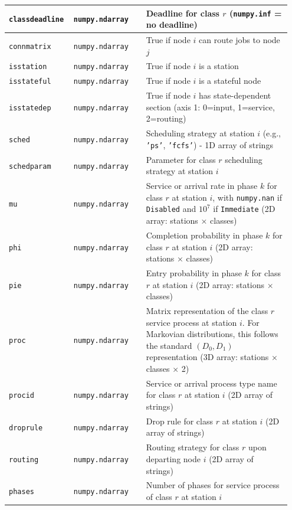 \begin{PYTHON}
{\begin{longtable}{|p{0.20\linewidth}|p{0.25\linewidth}|p{0.50\linewidth}|}
\texttt{classdeadline} & \texttt{numpy.ndarray} & Deadline for class $r$ (\texttt{numpy.inf} = no deadline)\\\hline
\texttt{connmatrix} & \texttt{numpy.ndarray} & True if node $i$ can route jobs to node $j$\\\hline
\texttt{isstation} & \texttt{numpy.ndarray} & True if node $i$ is a station\\\hline
\texttt{isstateful} & \texttt{numpy.ndarray} & True if node $i$ is a stateful node\\\hline
\texttt{isstatedep} & \texttt{numpy.ndarray} & True if node $i$ has state-dependent section (axis 1: 0=input, 1=service, 2=routing)\\\hline
\texttt{sched} & \texttt{numpy.ndarray} & Scheduling strategy at station $i$ (e.g., \texttt{'ps'}, \texttt{'fcfs'}) - 1D array of strings\\\hline
\texttt{schedparam} & \texttt{numpy.ndarray} & Parameter for class $r$ scheduling strategy at station $i$\\\hline
\texttt{mu} & \texttt{numpy.ndarray} & Service or arrival rate in phase $k$ for class $r$ at station $i$, with \texttt{numpy.nan} if \texttt{Disabled} and $10^7$ if \texttt{Immediate} (2D array: stations × classes)\\\hline
\texttt{phi} & \texttt{numpy.ndarray} & Completion probability in phase $k$ for class $r$ at station $i$ (2D array: stations × classes)\\\hline
\texttt{pie} & \texttt{numpy.ndarray} & Entry probability in phase $k$ for class $r$ at station $i$ (2D array: stations × classes)\\\hline
\texttt{proc} & \texttt{numpy.ndarray} & Matrix representation of the class $r$ service process at station $i$. For Markovian distributions, this follows the standard $(D_0,D_1)$ representation (3D array: stations × classes × 2)\\\hline
\texttt{procid} & \texttt{numpy.ndarray} & Service or arrival process type name for class $r$ at station $i$ (2D array of strings)\\\hline
\texttt{droprule} & \texttt{numpy.ndarray} & Drop rule for class $r$ at station $i$ (2D array of strings)\\\hline
\texttt{routing} & \texttt{numpy.ndarray} & Routing strategy for class $r$ upon departing node $i$ (2D array of strings)\\\hline
\texttt{phases} & \texttt{numpy.ndarray} & Number of phases for service process of class $r$ at station $i$\\\hline

\end{longtable}}
\end{PYTHON}
